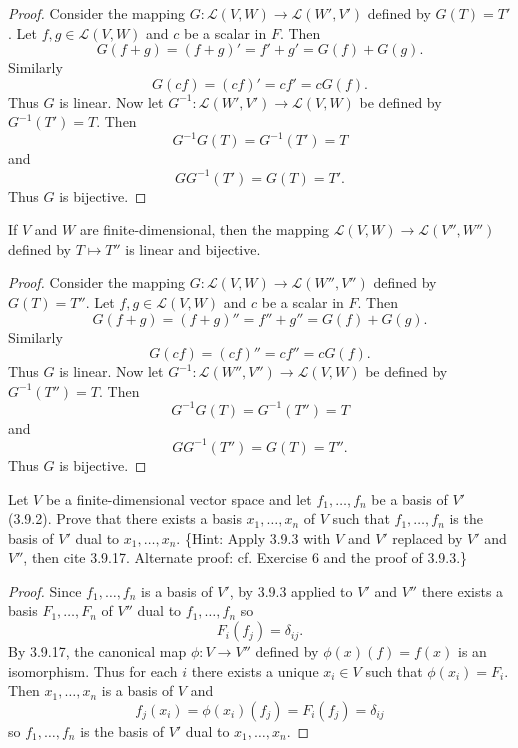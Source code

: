 \begin{proof}
    Consider the mapping 
    $G : \mathcal{L}(V, W) \longrightarrow \mathcal{L}(W', V')$ defined by $G(T) = T'$.
    Let $f, g \in \mathcal{L}(V, W)$ and $c$ be a scalar in $F$.
    Then 
    \[G(f + g) = (f + g)' = f' + g' = G(f) + G(g).\]
    Similarly 
    \[G(cf) = (cf)' = cf' = cG(f).\]
    Thus $G$ is linear. Now let $G^{-1} : \mathcal{L}(W', V') \longrightarrow \mathcal{L}(V, W)$ 
    be defined by $G^{-1}(T') = T$. Then
    \[G^{-1}G(T) = G^{-1}(T') = T\]
    and
    \[GG^{-1}(T') = G(T) = T'.\]
    Thus $G$ is bijective.
\end{proof}

\begin{tcolorbox}[title=Exercise 11, breakable]
    If $V$ and $W$ are finite-dimensional, then the mapping 
    $\mathcal{L}(V, W) \to \mathcal{L}(V'', W'')$ defined by $T \mapsto T''$ is linear and bijective.
\end{tcolorbox}

\begin{proof}
    Consider the mapping 
    $G : \mathcal{L}(V, W) \longrightarrow \mathcal{L}(W'', V'')$ defined by $G(T) = T''$.
    Let $f, g \in \mathcal{L}(V, W)$ and $c$ be a scalar in $F$.
    Then 
    \[G(f + g) = (f + g)'' = f'' + g'' = G(f) + G(g).\]
    Similarly 
    \[G(cf) = (cf)'' = cf'' = cG(f).\]
    Thus $G$ is linear. Now let $G^{-1} : \mathcal{L}(W'', V'') \longrightarrow \mathcal{L}(V, W)$ 
    be defined by $G^{-1}(T'') = T$. Then
    \[G^{-1}G(T) = G^{-1}(T'') = T\]
    and
    \[GG^{-1}(T'') = G(T) = T''.\]
    Thus $G$ is bijective.
\end{proof}

\begin{tcolorbox}[title=Exercise 12, breakable]
    Let $V$ be a finite-dimensional vector space and let $f_1, \ldots, f_n$ be a basis 
    of $V'$ (3.9.2). Prove that there exists a basis $x_1, \ldots, x_n$ of $V$ such that 
    $f_1, \ldots, f_n$ is the basis of $V'$ dual to $x_1, \ldots, x_n$. \{Hint: Apply 3.9.3 with 
    $V$ and $V'$ replaced by $V'$ and $V''$, then cite 3.9.17. Alternate proof: cf. 
    Exercise 6 and the proof of 3.9.3.\}
\end{tcolorbox}

\begin{proof}
    Since $f_1, \ldots, f_n$ is a basis of $V'$, by 3.9.3 applied to $V'$ and $V''$
    there exists a basis $F_1, \ldots, F_n$ of $V''$ dual to $f_1, \ldots, f_n$ so
    \[F_i(f_j) = \delta_{ij}.\]
    By 3.9.17, the canonical map $\phi : V \to V''$ defined by $\phi(x)(f) = f(x)$ 
    is an isomorphism. Thus for each $i$ there exists a unique $x_i \in V$ such that 
    $\phi(x_i) = F_i$. Then $x_1, \ldots, x_n$ is a basis of $V$ and
    \[f_j(x_i) = \phi(x_i)(f_j) = F_i(f_j) = \delta_{ij}\]
    so $f_1, \ldots, f_n$ is the basis of $V'$ dual to $x_1, \ldots, x_n$.
\end{proof}

